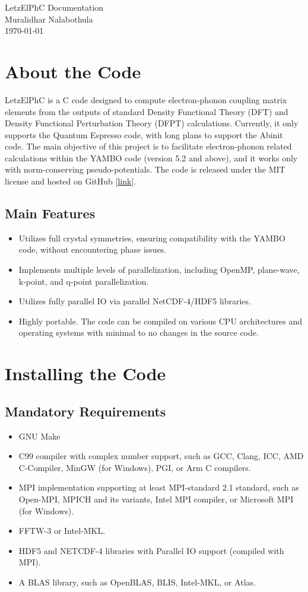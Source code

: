 \documentclass[12pt,twoside,openany]{book}
\renewcommand{\sectionmark}[1]{\markright{\thesection\ #1}}
\newcommand{\prefrontmatter}{\thispagestyle{empty}
   \begin{center}
        \huge\projecttitle\\
        \vspace{10pt}
        \large{\projectauthor}\\
        \vspace{10pt}
        \small{\projectmonth}\\
   \end{center}
    \clearpage
   \thispagestyle{empty}
}
\def\projectauthor{Muralidhar Nalabothula}
\def\projecttitle{LetzElPhC Documentation}
\def\projectmonth{\today}
\begin{document}
\prefrontmatter
{}
\renewcommand{\sectionmark}[1]{\markright{#1}}
\addtolength{\parskip}{-\baselineskip}  
\tableofcontents
\addtolength{\parskip}{\baselineskip}
\renewcommand{\sectionmark}[1]{\markright{\thesection\ #1}}
\clearpage
%
%
%
%
%
%
%
%
%
%
%
\chapter{About the Code}
LetzElPhC is a C code designed to compute electron-phonon coupling matrix elements from the outputs of standard Density Functional Theory (DFT) and Density Functional Perturbation Theory (DFPT) calculations. 
Currently, it only supports the Quantum Espresso code, with long plans to support the Abinit code. 
The main objective of this project is to facilitate electron-phonon related calculations 
within the YAMBO code (version 5.2 and above), and it works only with norm-conserving pseudo-potentials. 
The code is released under the MIT license and hosted on GitHub [\href{https://github.com/muralidhar-nalabothula/LetzElPhC}{link}].
\section{Main Features}
\begin{itemize}
\item Utilizes full crystal symmetries, ensuring compatibility with the YAMBO code, without encountering phase issues.
\item Implements multiple levels of parallelization, including OpenMP, plane-wave, k-point, and q-point parallelization.
\item Utilizes fully parallel IO via parallel NetCDF-4/HDF5 libraries.
\item Highly portable. The code can be compiled on various CPU architectures and operating systems with minimal to no changes in the source code.
\end{itemize}
\chapter{Installing the Code}
\section{Mandatory Requirements}
\begin{itemize}
\item GNU Make
\item C99 compiler with complex number support, such as GCC, Clang, ICC, AMD C-Compiler, MinGW (for Windows), PGI, or Arm C compilers.
\item MPI implementation supporting at least MPI-standard 2.1 standard, such as Open-MPI, MPICH and its variants, Intel MPI compiler, or Microsoft MPI (for Windows).
\item FFTW-3 or Intel-MKL.
\item HDF5 and NETCDF-4 libraries with Parallel IO support (compiled with MPI).
\item A BLAS library, such as OpenBLAS, BLIS, Intel-MKL, or Atlas.
\end{itemize}
\end{document}
